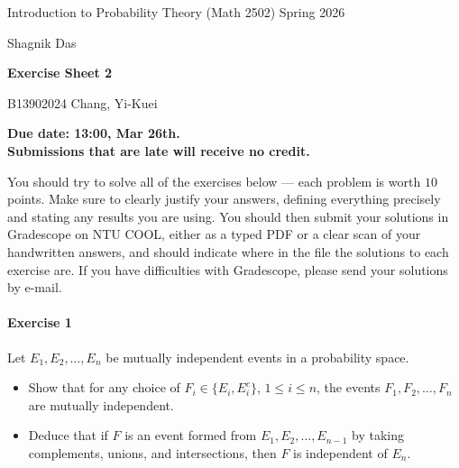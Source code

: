\documentclass[a4paper,12pt]{article}
\newcommand{\courseTitle}{Introduction to Probability Theory (Math 2502)}
\newcommand{\semester}{Spring 2026}
\newcommand{\instructorA}{Shagnik Das}
\newcommand{\instructorB}{}
\newcommand{\sheetNumber}{2}
\newcommand{\dueDate}{13:00, Mar 26th.}
\newcommand{\lateWarning}{Submissions that are late will receive no credit.}
\newcommand{\buildtitle}[4]{
\begin{flushleft}
{\large
#1
\hfill{}
#2
\par
#3
}
\end{flushleft}
\vskip 4pt
\begin{center}
{\large\bfseries#4\par}
\end{center}
\bigskip
}
\newcommand{\story}[1]{\iftoggle{story}{\footnote{#1}}{}}
\begin{document}
\buildtitle{\courseTitle{}}{\semester}{\instructorA{} \hfill \instructorB{}}{Exercise Sheet \sheetNumber{}}

\vspace{-0.2in}

\begin{center}
{B13902024 Chang, Yi-Kuei}

{\bf Due date: \dueDate \\ \lateWarning}

\end{center}

\noindent You should try to solve all of the exercises below --- each problem is worth $10$ points. Make sure to clearly justify your answers, defining everything precisely and stating any results you are using. You should then submit your solutions in Gradescope on NTU COOL, either as a typed PDF or a clear scan of your handwritten answers, and should indicate where in the file the solutions to each exercise are. If you have difficulties with Gradescope, please send your solutions by e-mail.

\paragraph{Exercise 1}  Let $E_1, E_2, \hdots, E_n$ be mutually independent events in a probability space.
\begin{itemize}
	\item[(a)] Show that for any choice of $F_i \in \{ E_i, E_i^c \}$, $1 \le i \le n$, the events $F_1, F_2, \hdots, F_n$ are mutually independent.
	\item[(b)] Deduce that if $F$ is an event formed from $E_1, E_2, \hdots, E_{n-1}$ by taking complements, unions, and intersections,\story{For example, we could have $F = \left( E_1 \cap E_3^c \cap E_4 \right) \cup \left(E_1^c \cap \left( E_2 \cup E_4^c \cup E_6 \right) \right)$.} then $F$ is independent of $E_n$.
\end{itemize}
\end{document}
